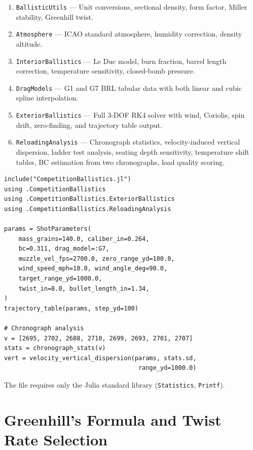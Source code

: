 \documentclass[11pt,twoside,openright]{report}
\begin{document}
\begin{enumerate}[nosep]
  \item \texttt{BallisticUtils} --- Unit conversions, sectional density, form factor, Miller stability, Greenhill twist.
  \item \texttt{Atmosphere} --- ICAO standard atmosphere, humidity correction, density altitude.
  \item \texttt{InteriorBallistics} --- Le Duc model, burn fraction, barrel length correction, temperature sensitivity, closed-bomb pressure.
  \item \texttt{DragModels} --- G1 and G7 BRL tabular data with both linear and cubic spline interpolation.
  \item \texttt{ExteriorBallistics} --- Full 3-DOF RK4 solver with wind, Coriolis, spin drift, zero-finding, and trajectory table output.
  \item \texttt{ReloadingAnalysis} --- Chronograph statistics, velocity-induced vertical dispersion, ladder test analysis, seating depth sensitivity, temperature shift tables, BC estimation from two chronographs, load quality scoring.
\end{enumerate}

\begin{lstlisting}[caption={Quick-start usage of CompetitionBallistics.jl},label={lst:quickstart}]
include("CompetitionBallistics.jl")
using .CompetitionBallistics
using .CompetitionBallistics.ExteriorBallistics
using .CompetitionBallistics.ReloadingAnalysis

params = ShotParameters(
    mass_grains=140.0, caliber_in=0.264,
    bc=0.311, drag_model=:G7,
    muzzle_vel_fps=2700.0, zero_range_yd=100.0,
    wind_speed_mph=10.0, wind_angle_deg=90.0,
    target_range_yd=1000.0,
    twist_in=8.0, bullet_length_in=1.34,
)
trajectory_table(params, step_yd=100)

# Chronograph analysis
v = [2695, 2702, 2688, 2710, 2699, 2693, 2701, 2707]
stats = chronograph_stats(v)
vert = velocity_vertical_dispersion(params, stats.sd,
                                     range_yd=1000.0)
\end{lstlisting}

The file requires only the Julia standard library (\texttt{Statistics}, \texttt{Printf}).


\chapter{Greenhill's Formula and Twist Rate Selection}
\label{app:greenhill}
\end{document}
